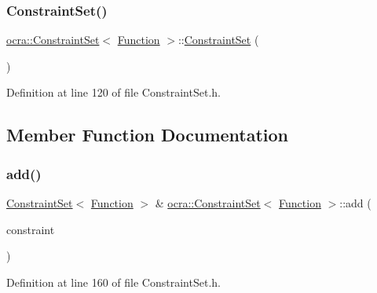 \subsubsection{\texorpdfstring{Constraint\+Set()}{ConstraintSet()}}
{\footnotesize\ttfamily \hyperlink{classocra_1_1ConstraintSet}{ocra\+::\+Constraint\+Set}$<$ \hyperlink{classocra_1_1Function}{Function} $>$\+::\hyperlink{classocra_1_1ConstraintSet}{Constraint\+Set} (\begin{DoxyParamCaption}{ }\end{DoxyParamCaption})\hspace{0.3cm}{\ttfamily [inline]}}



Definition at line 120 of file Constraint\+Set.\+h.



\subsection{Member Function Documentation}
\hypertarget{classocra_1_1ConstraintSet_3_01Function_01_4_a6a52d3b1aa1a8c30f6adbda59894e852}{}\label{classocra_1_1ConstraintSet_3_01Function_01_4_a6a52d3b1aa1a8c30f6adbda59894e852} 
\subsubsection{\texorpdfstring{add()}{add()}\hspace{0.1cm}{\footnotesize\ttfamily [1/2]}}
{\footnotesize\ttfamily \hyperlink{classocra_1_1ConstraintSet}{Constraint\+Set}$<$ \hyperlink{classocra_1_1Function}{Function} $>$ \& \hyperlink{classocra_1_1ConstraintSet}{ocra\+::\+Constraint\+Set}$<$ \hyperlink{classocra_1_1Function}{Function} $>$\+::add (\begin{DoxyParamCaption}\item[{\hyperlink{namespaceocra_af10341108ce661566aad00908668e2b1}{Generic\+Constraint} $\ast$}]{constraint }\end{DoxyParamCaption})\hspace{0.3cm}{\ttfamily [inline]}}



Definition at line 160 of file Constraint\+Set.\+h.

\hypertarget{classocra_1_1ConstraintSet_3_01Function_01_4_ae7914b97dc71ef0604e5f853dbe14162}{}\label{classocra_1_1ConstraintSet_3_01Function_01_4_ae7914b97dc71ef0604e5f853dbe14162} 
